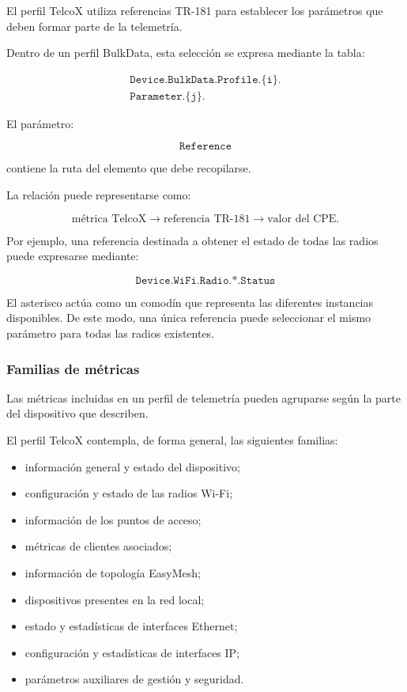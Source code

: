 El perfil TelcoX utiliza referencias TR-181 para establecer los
parámetros que deben formar parte de la telemetría.

Dentro de un perfil BulkData, esta selección se expresa mediante la
tabla:

\[
\begin{split}
    \texttt{Device.BulkData.Profile.\{i\}.}\\
    \texttt{Parameter.\{j\}.}
\end{split}
\]

El parámetro:

\[
    \texttt{Reference}
\]

contiene la ruta del elemento que debe recopilarse.

La relación puede representarse como:

\[
    \text{métrica TelcoX}
    \longrightarrow
    \text{referencia TR-181}
    \longrightarrow
    \text{valor del CPE}.
\]

Por ejemplo, una referencia destinada a obtener el estado de todas las
radios puede expresarse mediante:

\[
    \texttt{Device.WiFi.Radio.*.Status}
\]

El asterisco actúa como un comodín que representa las diferentes
instancias disponibles. De este modo, una única referencia puede
seleccionar el mismo parámetro para todas las radios existentes.


\subsubsection*{Familias de métricas}

Las métricas incluidas en un perfil de telemetría pueden agruparse según
la parte del dispositivo que describen.

El perfil TelcoX contempla, de forma general, las siguientes familias:

\begin{itemize}
    \item información general y estado del dispositivo;

    \item configuración y estado de las radios Wi-Fi;

    \item información de los puntos de acceso;

    \item métricas de clientes asociados;

    \item información de topología EasyMesh;

    \item dispositivos presentes en la red local;

    \item estado y estadísticas de interfaces Ethernet;

    \item configuración y estadísticas de interfaces IP;

    \item parámetros auxiliares de gestión y seguridad.
\end{itemize}

